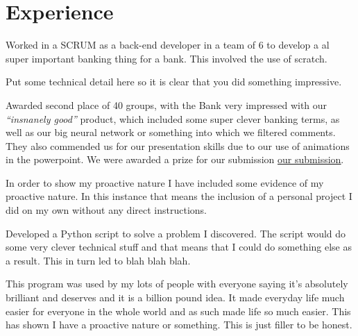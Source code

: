 \begin{minipage}[t]{0.66\textwidth} %


\section{Experience}


\vspace{\topsep} %
\begin{tightitemize}
\item Worked in a SCRUM as a back-end developer in a team of 6 to develop a al super important banking thing for a bank. This involved the use of scratch.
\item Put some technical detail here so it is clear that you did something impressive.
\item Awarded second place of 40 groups, with the Bank very impressed with our \textit{“insnanely good”} product, which included some super clever banking terms, as well as our big neural network or something into which we filtered comments. They also commended us for our presentation skills due to our use of animations in the powerpoint. We were awarded a prize for our submission \href{Your submimssion here}{\underline{our submission}}.
\end{tightitemize}

\sectionspace %



\begin{tightitemize}
\item In order to show my proactive nature I have included some evidence of my proactive nature. In this instance that means the inclusion of a personal project I did on my own without any direct instructions.
\item Developed a Python script to solve a problem I discovered. The script would do some very clever technical stuff and that means that I could do something else as a result. This in turn led to blah blah blah.
\item This program was used by my lots of people with everyone saying it's absolutely brilliant and deserves and it is a billion pound idea. It made everyday life much easier for everyone in the whole world and as such made life so much easier. This has shown I have a proactive nature or something. This is just filler to be honest.
\end{tightitemize}


\end{minipage}
